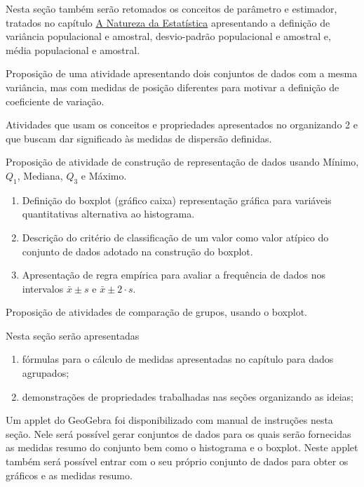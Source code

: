 \begin{apresentacao}
Nesta seção também serão retomados os conceitos de parâmetro e estimador, tratados no capítulo \hyperref[est1-chap]{A Natureza da Estatística} apresentando a definição de variância populacional e amostral, desvio-padrão populacional e amostral e, média populacional e amostral.

Proposição de uma atividade apresentando dois conjuntos de dados com a mesma variância, mas com medidas de posição diferentes para motivar a definição de coeficiente de variação.

Atividades que usam os conceitos e propriedades apresentados no organizando 2 e que buscam dar significado às medidas de dispersão definidas.

Proposição de atividade de construção de representação de dados usando Mínimo, $Q_1$, Mediana, $Q_3$ e Máximo.

\begin{enumerate}
\item Definição do boxplot (gráfico caixa) representação gráfica para variáveis quantitativas alternativa ao histograma.
\item Descrição do critério de classificação de um valor como valor atípico do conjunto de dados adotado na construção do boxplot.
\item Apresentação de regra empírica para avaliar a frequência de dados nos intervalos $\bar{x}\pm s$ e $\bar{x}\pm2\cdot s$.
\end{enumerate}

Proposição de atividades de comparação de grupos, usando o boxplot.


Nesta seção serão apresentadas

\begin{enumerate}
\item fórmulas para o cálculo de medidas apresentadas no capítulo para dados agrupados;
\item demonstrações de propriedades trabalhadas nas seções organizando as ideias;
\end{enumerate}


Um applet do GeoGebra foi disponibilizado com manual de instruções nesta seção. Nele será possível gerar conjuntos de dados para os quais serão fornecidas as medidas resumo do conjunto bem como o histograma e o boxplot. Neste applet também será possível entrar com o seu próprio conjunto de dados para obter os gráficos e as medidas resumo.


\end{apresentacao}
